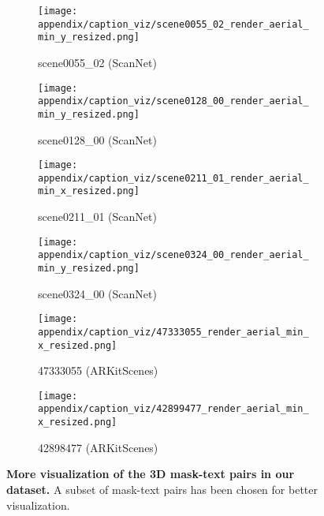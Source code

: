     
\begin{figure*}[htbp]
    \centering
    \begin{minipage}{\textwidth}
        \begin{subfigure}[b]{0.45\textwidth}
            \texttt{[image: appendix/caption\_viz/scene0055\_02\_render\_aerial\_min\_y\_resized.png]}
            \caption{scene0055\_02 (ScanNet)}
            \label{fig:scene0055}
        \end{subfigure}%
        \hfill%
        \begin{subfigure}[b]{0.45\textwidth}
            \texttt{[image: appendix/caption\_viz/scene0128\_00\_render\_aerial\_min\_y\_resized.png]}
            \caption{scene0128\_00 (ScanNet)}
            \label{fig:scene0128}
        \end{subfigure}
    \end{minipage}
    
    \vspace{10pt}  %
    
    \begin{minipage}{\textwidth}
        \begin{subfigure}[b]{0.45\textwidth}
            \texttt{[image: appendix/caption\_viz/scene0211\_01\_render\_aerial\_min\_x\_resized.png]}
            \caption{scene0211\_01 (ScanNet)}
            \label{fig:scene0211}
        \end{subfigure}%
        \hfill%
        \begin{subfigure}[b]{0.45\textwidth}
            \texttt{[image: appendix/caption\_viz/scene0324\_00\_render\_aerial\_min\_y\_resized.png]}
            \caption{scene0324\_00 (ScanNet)}
            \label{fig:scene0324}
        \end{subfigure}
    \end{minipage}

    \begin{minipage}{\textwidth}
        \begin{subfigure}[b]{0.45\textwidth}
            \texttt{[image: appendix/caption\_viz/47333055\_render\_aerial\_min\_x\_resized.png]}
            \caption{47333055 (ARKitScenes)}
            \label{fig:47333055}
        \end{subfigure}%
        \hfill%
        \begin{subfigure}[b]{0.45\textwidth}
            \texttt{[image: appendix/caption\_viz/42899477\_render\_aerial\_min\_x\_resized.png]}
            \caption{42898477 (ARKitScenes)}
            \label{fig:42899477}
        \end{subfigure}
    \end{minipage}
    
    \caption{\textbf{More visualization of the 3D mask-text pairs in our \dataname dataset.} A subset of mask-text pairs has been chosen for better visualization.}
    \label{fig:caption_viz_all}
\end{figure*}

